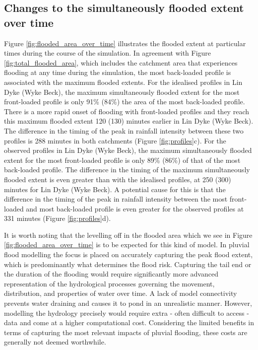 \documentclass[APA,Times2COL]{WileyNJDv5}
\begin{document}
\subsection{Changes to the simultaneously flooded extent over time}\label{subsec:flood_over_time}

Figure \ref{fig:flooded_area_over_time} illustrates the flooded extent at particular times during the course of the simulation. In agreement with Figure \ref{fig:total_flooded_area}, which includes the catchment area that experiences flooding at any time during the simulation, the most back-loaded profile is associated with the maximum flooded extents. For the idealised profiles in Lin Dyke (Wyke Beck), the maximum simultaneously flooded extent for the most front-loaded profile is only 91\% (84\%) the area of the most back-loaded profile. There is a more rapid onset of flooding with front-loaded profiles and they reach this maximum flooded extent 120 (130) minutes earlier in Lin Dyke (Wyke Beck). The difference in the timing of the peak in rainfall intensity between these two profiles is 288 minutes in both catchments (Figure \ref{fig:profiles}c). For the observed profiles in Lin Dyke (Wyke Beck), the maximum simultaneously flooded extent for the most front-loaded profile is only 89\% (86\%) of that of the most back-loaded profile. The difference in the timing of the maximum simultaneously flooded extent is even greater than with the idealised profiles, at 250 (300) minutes for Lin Dyke (Wyke Beck). A potential cause for this is that the difference in the timing of the peak in rainfall intensity between the most front-loaded and most back-loaded profile is even greater for the observed profiles at 331 minutes (Figure \ref{fig:profiles}d). 

It is worth noting that the levelling off in the flooded area which we see in Figure \ref{fig:flooded_area_over_time} is to be expected for this kind of model. In pluvial flood modelling the focus is placed on accurately capturing the peak flood extent, which is predominantly what determines the flood risk. Capturing the tail end or the duration of the flooding would require significantly more advanced representation of the hydrological processes governing the movement, distribution, and properties of water over time. A lack of model connectivity prevents water draining and causes it to pond in an unrealistic manner. However, modelling the hydrology precisely would require extra - often difficult to access - data and come at a higher computational cost. Considering the limited benefits in terms of capturing the most relevant impacts of pluvial flooding, these costs are generally not deemed worthwhile.
\end{document}
